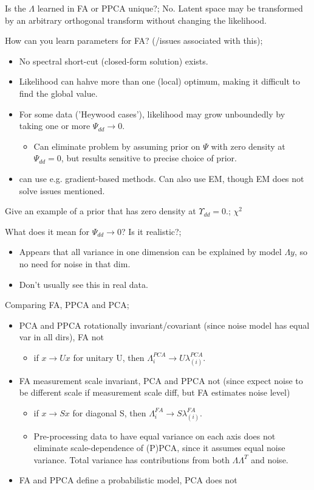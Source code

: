 \documentclass{article}
\begin{document}
Is the $\Lambda$ learned in FA or PPCA unique?; No. Latent space may be transformed by an arbitrary orthogonal transform without changing the likelihood.

How can you learn parameters for FA? (/issues associated with this); \begin{itemize}
	\item No spectral short-cut (closed-form solution) exists.
	\item Likelihood can hahve more than one (local) optimum, making it difficult to find the global value.
	\item For some data ('Heywood cases'), likelihood may grow unboundedly by taking one or more $\Psi_{dd}\rightarrow 0$.
	\begin{itemize}
		\item Can eliminate problem by assuming prior on $\Psi$ with zero density at $\Psi_{dd}=0$, but results sensitive to precise choice of prior.
	\end{itemize}
	\item can use e.g. gradient-based methods. Can also use EM, though EM does not solve issues mentioned.
\end{itemize}

Give an example of a prior that has zero density at $\Upsilon_{dd}=0$.; $\chi^2$ 

What does it mean for $\Psi_{dd}\rightarrow 0$? Is it realistic?; \begin{itemize}
	\item Appears that all variance in one dimension can be explained by model $\Lambda y$, so no need for noise in that dim.
	\item Don't usually see this in real data.
\end{itemize}

Comparing FA, PPCA and PCA; \begin{itemize}
	\item PCA and PPCA rotationally invariant/covariant (since noise model has equal var in all dirs), FA not
	\begin{itemize}
		\item if $x\rightarrow Ux$ for unitary U, then $\Lambda^{PCA}_{i}\rightarrow U \lambda^{PCA}_{(i)}$.
	\end{itemize}
	\item FA measurement scale invariant, PCA and PPCA not (since expect noise to be different scale if measurement scale diff, but FA estimates noise level)
		\begin{itemize}
		\item if $x\rightarrow Sx$ for diagonal S, then $\Lambda^{FA}_{i}\rightarrow S \lambda^{FA}_{(i)}$.
		\item Pre-processing data to have equal variance on each axis does not eliminate scale-dependence of (P)PCA, since it assumes equal noise variance. Total variance has contributions from both $\Lambda\Lambda^T$ and noise.
	\end{itemize}
	\item FA and PPCA define a probabilistic model, PCA does not
\end{itemize}
\end{document}

